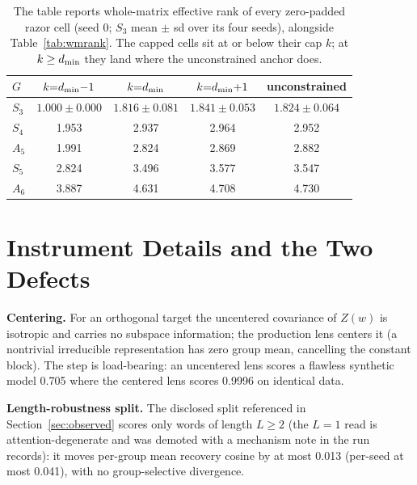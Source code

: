 \begin{table}[H]
\centering
\small
\begin{tabular}{lcccc}
\toprule
$G$ & $k{=}d_{\min}{-}1$ & $k{=}d_{\min}$ & $k{=}d_{\min}{+}1$ & unconstrained \\
\midrule
$S_3$ & $1.000 \pm 0.000$ & $1.816 \pm 0.081$ & $1.841 \pm 0.053$ & $1.824 \pm 0.064$ \\
$S_4$ & 1.953 & 2.937 & 2.964 & 2.952 \\
$A_5$ & 1.991 & 2.824 & 2.869 & 2.882 \\
$S_5$ & 2.824 & 3.496 & 3.577 & 3.547 \\
$A_6$ & 3.887 & 4.631 & 4.708 & 4.730 \\
\bottomrule
\end{tabular}
\caption{The table reports whole-matrix effective rank of every zero-padded
razor cell (seed 0; $S_3$ mean $\pm$ sd over its four seeds), alongside
Table~\ref{tab:wmrank}. The capped cells sit at or below their
cap $k$; at $k \geq d_{\min}$ they land where the unconstrained anchor does.}
\label{tab:wmrank_cells}
\end{table}

\section{Instrument Details and the Two Defects}
\label{app:instrument}

\textbf{Centering.} For an orthogonal target the uncentered covariance
of $Z(w)$ is isotropic and carries no subspace information; the
production lens centers it (a nontrivial irreducible representation has
zero group mean, cancelling the constant block). The step is
load-bearing: an uncentered lens scores a flawless synthetic model 0.705
where the centered lens scores 0.9996 on identical data.

\textbf{Length-robustness split.} The disclosed split referenced in
Section~\ref{sec:observed} scores only words of length $L \geq 2$
(the $L = 1$ read is attention-degenerate and was demoted with a
mechanism note in the run records): it moves per-group mean recovery
cosine by at most 0.013 (per-seed at most 0.041), with no
group-selective divergence.

